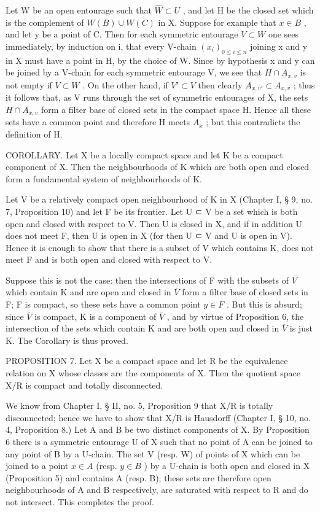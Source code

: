 Let W be an open entourage such that \(\hat{W} \subset U\) , and let H be the closed set which is the complement of \(W(B) \cup W(C)\) in X. Suppose for example that \(x \in B\) , and let y be a point of C. Then for each symmetric entourage \(V \subset W\) one sees immediately, by induction on i, that every V-chain \((x_{i})_{0 \leqslant i \leqslant n}\) joining x and y in X must have a point in H, by the choice of W. Since by hypothesis x and y can be joined by a V-chain for each symmetric entourage V, we see that \(H \cap A_{x,v}\) is not empty if \(V \subset W\) . On the other hand, if \(V' \subset V\) then clearly \(A_{x,v'} \subset A_{x,v}\) ; thus it follows that, as V runs through the set of symmetric entourages of X, the sets \(H \cap A_{x,v}\) form a filter base of closed sets in the compact space H. Hence all these sets have a common point and therefore H meets \(A_{x}\) ; but this contradicts the definition of H.

COROLLARY. Let X be a locally compact space and let K be a compact component of X. Then the neighbourhoods of K which are both open and closed form a fundamental system of neighbourhoods of K.

Let V be a relatively compact open neighbourhood of K in X (Chapter I, § 9, no. 7, Proposition 10) and let F be its frontier. Let U ⊂ V be a set which is both open and closed with respect to V. Then U is closed in X, and if in addition U does not meet F, then U is open in X (for then U ⊂ V and U is open in V). Hence it is enough to show that there is a subset of V which contains K, does not meet F and is both open and closed with respect to V.

Suppose this is not the case: then the intersections of F with the subsets of \(\overline{V}\) which contain K and are open and closed in \(\overline{V}\) form a filter base of closed sets in F; F is compact, so these sets have a common point \(y \in F\) . But this is absurd; since \(\overline{V}\) is compact, K is a component of \(\overline{V}\) , and by virtue of Proposition 6, the intersection of the sets which contain K and are both open and closed in \(\overline{V}\) is just K. The Corollary is thus proved.

PROPOSITION 7. Let X be a compact space and let R be the equivalence relation on X whose classes are the components of X. Then the quotient space X/R is compact and totally disconnected.

We know from Chapter I, § II, no. 5, Proposition 9 that X/R is totally disconnected; hence we have to show that X/R is Hausdorff (Chapter I, § 10, no. 4, Proposition 8.) Let A and B be two distinct components of X. By Proposition 6 there is a symmetric entourage U of X such that no point of A can be joined to any point of B by a U-chain. The set V (resp. W) of points of X which can be joined to a point \(x \in A\) (resp. \(y \in B\) ) by a U-chain is both open and closed in X (Proposition 5) and contains A (resp. B); these sets are therefore open neighbourhoods of A and B respectively, are saturated with respect to R and do not intersect. This completes the proof.

